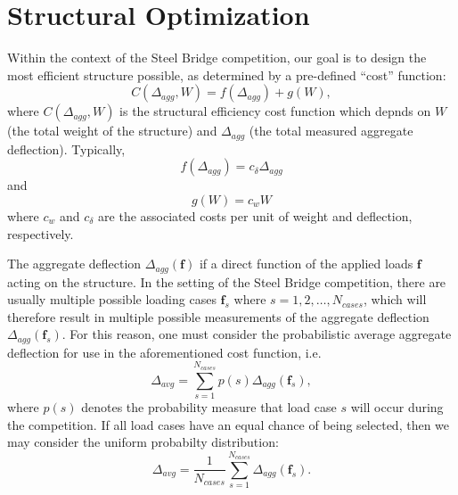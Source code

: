 \documentclass[12pt,a4paper,article]{memoir} %
\begin{document}


\section{Structural Optimization}

Within the context of the Steel Bridge competition, our goal is to design the most efficient structure possible, as determined by a pre-defined ``cost'' function:
\begin{equation}
	C(\Delta_{agg}, W) = f(\Delta_{agg}) + g(W),
\end{equation}
where $C(\Delta_{agg}, W)$ is the structural efficiency cost function which depnds on $W$ (the total weight of the structure) and $\Delta_{agg}$ (the total measured aggregate deflection). Typically,
\begin{equation}
	f(\Delta_{agg}) = c_\delta \Delta_{agg}
\end{equation}
and
\begin{equation}
	g(W) = c_w W
\end{equation}
where $c_w$ and $c_\delta$ are the associated costs per unit of weight and deflection, respectively.

The aggregate deflection $\Delta_{agg} (\mathbf{f})$ if a direct function of the applied loads $\mathbf{f}$ acting on the structure. In the setting of the Steel Bridge competition, there are usually multiple possible loading cases $\mathbf{f}_s$ where $s = 1, 2, \ldots, N_{cases}$, which will therefore result in multiple possible measurements of the aggregate deflection $\Delta_{agg} (\mathbf{f}_s)$. For this reason, one must consider the probabilistic average aggregate deflection for use in the aforementioned cost function, i.e.
\begin{equation}
	\Delta_{avg} = \sum_{s=1}^{N_{cases}} p(s) \Delta_{agg} (\mathbf{f}_s),
\end{equation}
where $p(s)$ denotes the probability measure that load case $s$ will occur during the competition. If all load cases have an equal chance of being selected, then we may consider the uniform probabilty distribution:
\begin{equation}
	\Delta_{avg} = \frac{1}{N_{cases}} \sum_{s=1}^{N_{cases}} \Delta_{agg} (\mathbf{f}_s).
\end{equation}
\end{document}
